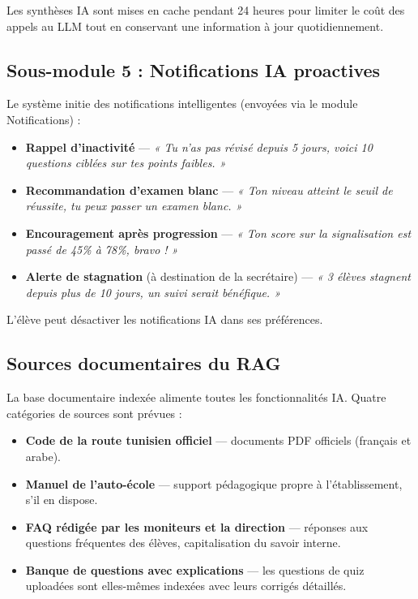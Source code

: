 \documentclass[12pt,a4paper]{article}
\begin{document}
Les synthèses IA sont mises en cache pendant 24 heures pour limiter le coût des appels au LLM tout en conservant une information à jour quotidiennement.

\subsection{Sous-module 5 : Notifications IA proactives}

Le système initie des notifications intelligentes (envoyées via le module Notifications) :

\begin{itemize}[leftmargin=*,itemsep=4pt]
    \item \textbf{Rappel d'inactivité} --- \textit{« Tu n'as pas révisé depuis 5 jours, voici 10 questions ciblées sur tes points faibles. »}
    \item \textbf{Recommandation d'examen blanc} --- \textit{« Ton niveau atteint le seuil de réussite, tu peux passer un examen blanc. »}
    \item \textbf{Encouragement après progression} --- \textit{« Ton score sur la signalisation est passé de 45\% à 78\%, bravo ! »}
    \item \textbf{Alerte de stagnation} (à destination de la secrétaire) --- \textit{« 3 élèves stagnent depuis plus de 10 jours, un suivi serait bénéfique. »}
\end{itemize}

L'élève peut désactiver les notifications IA dans ses préférences.

\subsection{Sources documentaires du RAG}

La base documentaire indexée alimente toutes les fonctionnalités IA. Quatre catégories de sources sont prévues :

\begin{itemize}[leftmargin=*,itemsep=4pt]
    \item \textbf{Code de la route tunisien officiel} --- documents PDF officiels (français et arabe).
    \item \textbf{Manuel de l'auto-école} --- support pédagogique propre à l'établissement, s'il en dispose.
    \item \textbf{FAQ rédigée par les moniteurs et la direction} --- réponses aux questions fréquentes des élèves, capitalisation du savoir interne.
    \item \textbf{Banque de questions avec explications} --- les questions de quiz uploadées sont elles-mêmes indexées avec leurs corrigés détaillés.
\end{itemize}
\end{document}
